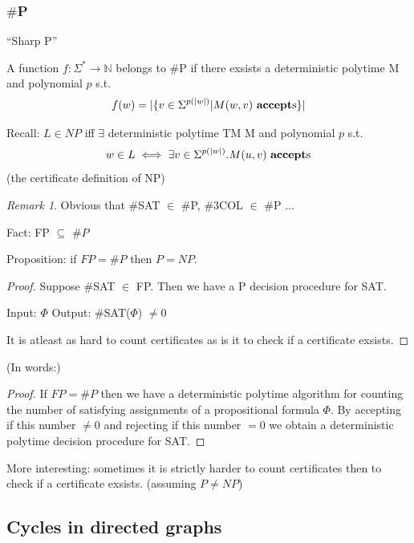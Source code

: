 \documentclass[a4paper,12pt]{article}
\theoremstyle{definition}
\theoremstyle{remark}
\newtheorem*{remark}{Remark}
\newcommand{\N}{\mathbb{N}}
\begin{document}
\subsubsection{$\#$P}
``Sharp P''

A function $f: \Sigma^* \to \N$ belongs to $\#$P if there exsists a deterministic polytime M
and polynomial $p$ s.t.
\begin{equation*}
    f(w) = |\{v \in \Sigma^{p(|w|)} | M(w, v) \text{ \textbf{accept}s}\}|
\end{equation*}

Recall: $L \in NP$ iff $\exists$ deterministic polytime TM M and polynomial $p$ s.t.
\begin{equation*}
    w \in L \iff \exists v \in \Sigma^{p(|w|)} . M(u, v) \text{ \textbf{accept}s}
\end{equation*}
(the certificate definition of NP)

\begin{remark}
    Obvious that $\#$SAT $\in$ $\#$P, $\#$3COL $\in$ $\#$P ...
\end{remark}

Fact: FP $\subseteq$ $\#P$

Proposition: if $FP = \#P$ then $P = NP$.

\begin{proof}
    Suppose $\#$SAT $\in$ FP. Then we have a P decision procedure for SAT.

    Input: $\Phi$
    Output: $\#$SAT($\Phi$) $\neq 0$

    It is atleast as hard to count certificates as is it to check if a certificate exsists.
\end{proof}

(In words:)
\begin{proof}
    If $FP = \#P$ then we have a deterministic polytime algorithm for counting the number of satisfying assignments of a propositional formula $\Phi$.
    By accepting if this number $\neq 0$ and rejecting if this number $= 0$ we obtain a deterministic polytime decision procedure for SAT.
\end{proof}

More interesting:
    sometimes it is strictly harder to count certificates then to check if a certificate exsists. (assuming $P \neq NP$)

\subsection{Cycles in directed graphs}
\end{document}

